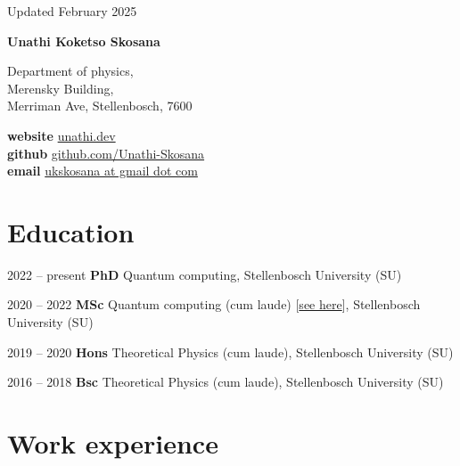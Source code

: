 \documentclass[10pt]{extreport}
\newcommand*{\name}{Unathi Koketso Skosana}
\newcommand{\namefont}[1]{{\normalfont\bfseries\Huge{#1}}}
\begin{document}
\begin{center}
	\vfill
	\small {Updated February 2025}
\end{center}

\vspace{2em}

\namefont{\name}

\vspace{1em}

\begin{minipage}[t]{0.45\linewidth}
	Department of physics, \\
	Merensky Building, \\
	Merriman Ave, Stellenbosch, 7600
\end{minipage}
\hfill
\begin{minipage}[t]{0.5\linewidth}
	\textbf{website} \href{https://www.unathi.dev}{unathi.dev} \\
	\textbf{github}  \href{https://www.github.com/Unathi-Skosana}{github.com/Unathi-Skosana}  \\
	\textbf{email} \href{mailto:ukskosana@gmail.com}{ukskosana at gmail dot com} \hfill
\end{minipage}

\section*{Education}

\begin{tablist}
	\item[2022 -- present]     \tab{}\textbf{PhD} Quantum computing, Stellenbosch University (SU)
	\item[2020 -- 2022] \tab{}\textbf{MSc} Quantum computing ({cum laude}) [\href{https://github.com/Unathi-Skosana/mastersthesis}{see here}], Stellenbosch University (SU)
\item[2019 -- 2020]  \tab{}\textbf{Hons} Theoretical Physics ({cum laude}), Stellenbosch University (SU)
\item[2016 -- 2018]  \tab{}\textbf{Bsc} Theoretical Physics ({cum laude}), Stellenbosch University (SU)
\end{tablist}

\section*{Work experience}
\end{document}

